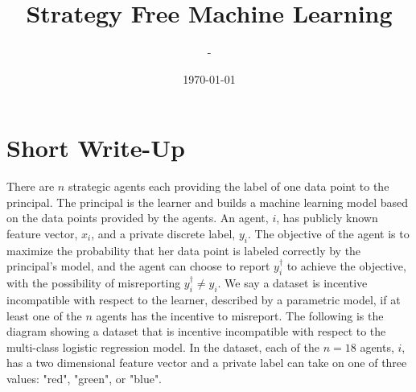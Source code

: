 \documentclass{article}
\title{Strategy Free Machine Learning}
\author{-}
\date{\today}
\begin{document}
\newtheorem{thm}{Theorem}
\newtheorem{cor}{Corollary}
\newtheorem{lem}{Lemma}
\newtheorem{prop}{Proposition}
\newtheorem{conj}{Conjecture}
\newtheorem{algo}{Algorithm}
\newtheorem{obs}{Observation}
\newtheorem{clm}{Claim}
\theoremstyle{definition}
\newtheorem{df}{Definition}
\newtheorem{eg}{Example}
\newtheorem{asm}{Assumption}
\newtheorem{cond}{Condition}
\theoremstyle{remark}
\newtheorem{rmk}{Remark}
\maketitle \onehalfspacing \allowdisplaybreaks \raggedbottom


\section{Short Write-Up} 
There are $n $ strategic agents each providing the label of one data point to the principal. The principal is the learner and builds a machine learning model based on the data points provided by the agents. An agent, $i $, has publicly known feature vector, $x_{i}$, and a private discrete label, $y_{i}$. The objective of the agent is to maximize the probability that her data point is labeled correctly by the principal's model, and the agent can choose to report $y^{\dagger}_{i}$ to achieve the objective, with the possibility of misreporting $y^{\dagger}_{i} \neq  y_{i}$. We say a dataset is incentive incompatible with respect to the learner, described by a parametric model, if at least one of the $n $ agents has the incentive to misreport.
\newline \newline
The following is the diagram showing a dataset that is incentive incompatible with respect to the multi-class logistic regression model. In the dataset, each of the $n  = 18$ agents, $i $, has a two dimensional feature vector and a private label can take on one of three values: "red", "green", or "blue".
\newline \newline
\end{document}
